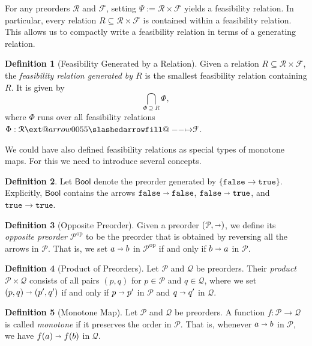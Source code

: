 \documentclass[12pt]{article}
\makeatletter
\theoremstyle{definition}
\newtheorem{definition}{Definition}[section]
\theoremstyle{plain}
\theoremstyle{plain}
\theoremstyle{plain}
\theoremstyle{plain}
\theoremstyle{remark}
\theoremstyle{remark}
\newcommand{\mc}[1]{\mathcal{#1}}
\newcommand{\sub}{\subseteq}
\newcommand{\true}{\mathtt{true}}
\newcommand{\false}{\mathtt{false}}
\def\slashedarrowfill@#1#2#3#4#5{%
	$\m@th\thickmuskip0mu\medmuskip\thickmuskip\thinmuskip\thickmuskip
	\relax#5#1\mkern-7mu%
	\cleaders\hbox{$#5\mkern-2mu#2\mkern-2mu$}\hfill
	\mathclap{#3}\mathclap{#2}%
	\cleaders\hbox{$#5\mkern-2mu#2\mkern-2mu$}\hfill
	\mkern-7mu#4$%
}
\def\rightslashedarrowfill@{%
	\slashedarrowfill@\relbar\relbar\mapstochar\rightarrow}
\newcommand\xslashedrightarrow[2][]{%
	\ext@arrow 0055{\rightslashedarrowfill@}{#1}{#2}}
\makeatother
\begin{document}
For any preorders $\mc{R}$ and $\mc{F}$, setting $\Psi := \mc{R} \times \mc{F}$ yields a feasibility relation. In particular, every relation $R \sub \mc{R} \times \mc{F}$ is contained within a feasibility relation. This allows us to compactly write a feasibility relation in terms of a generating relation.
\begin{definition}[Feasibility Generated by a Relation]
	Given a relation $R \sub \mc{R} \times \mc{F}$, the \emph{feasibility relation generated by $R$} is the smallest feasibility relation containing $R$. It is given by $$\bigcap_{\Phi \supseteq R} \Phi ,$$
	where $\Phi$ runs over all feasibility relations $\Phi: \mc{R} \xslashedrightarrow{} \mc{F}$.
\end{definition}


We could have also defined feasibility relations as special types of monotone maps. For this we need to introduce several concepts.

\begin{definition}
	Let $\mathsf{Bool}$ denote the preorder generated by $\{\false \rightarrow \true\}$. Explicitly, $\mathsf{Bool}$ contains the arrows $\false \shortrightarrow \false$, $\false \shortrightarrow \true$, and $\true \rightarrow \true$.
\end{definition}

\begin{definition}[Opposite Preorder]
	Given a preorder $(\mc{P},\shortrightarrow)$, we define its \emph{opposite preorder} $\mc{P}^\text{op}$ to be the preorder that is obtained by reversing all the arrows in $\mc{P}$. That is, we set $a \shortrightarrow b$ in $\mc{P}^\text{op}$ if and only if $b \shortrightarrow a$ in $\mc{P}$. 
\end{definition}

\begin{definition}[Product of Preorders]
	Let $\mc{P}$ and $\mc{Q}$ be preorders. Their \emph{product} $\mc{P} \times \mc{Q}$ consists of all pairs $(p,q)$ for $p \in \mc{P}$ and $q \in \mc{Q}$, where we set $(p,q) \shortrightarrow (p',q')$ if and only if $p \shortrightarrow p'$ in $\mc{P}$ and $q \shortrightarrow q'$ in $\mc{Q}$.
\end{definition}

\begin{definition}[Monotone Map]
	Let $\mc{P}$ and $\mc{Q}$ be preorders. A function $f: \mc{P} \rightarrow \mc{Q}$ is called \emph{monotone} if it preserves the order in $\mc{P}$. That is, whenever $a \shortrightarrow b$ in $\mc{P}$, we have $f(a) \shortrightarrow f(b)$ in $\mc{Q}$.
\end{definition}
\end{document}
